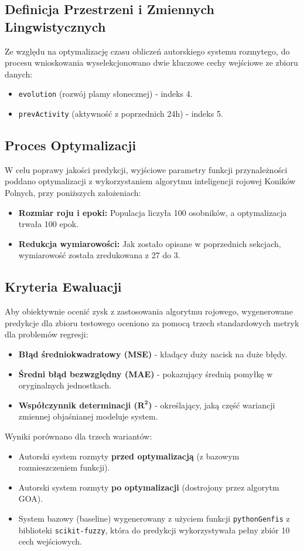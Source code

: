 \documentclass[12pt, a4paper]{article}
\begin{document}
\subsection{Definicja Przestrzeni i Zmiennych Lingwistycznych}
Ze względu na optymalizację czasu obliczeń autorskiego systemu rozmytego, do procesu wnioskowania wyselekcjonowano dwie kluczowe cechy wejściowe ze zbioru danych:
\begin{itemize}
    \item \texttt{evolution} (rozwój plamy słonecznej) - indeks 4.
    \item \texttt{prevActivity} (aktywność z poprzednich 24h) - indeks 5.
\end{itemize}

\subsection{Proces Optymalizacji}
W celu poprawy jakości predykcji, wyjściowe parametry funkcji przynależności poddano optymalizacji z wykorzystaniem algorytmu inteligencji rojowej Koników Polnych, przy poniższych założeniach:
\begin{itemize}
    \item \textbf{Rozmiar roju i epoki:} Populacja liczyła 100 osobników, a optymalizacja trwała 100 epok.
    \item \textbf{Redukcja wymiarowości:} Jak zostało opisane w poprzednich sekcjach, wymiarowość została zredukowana z 27 do 3. 
\end{itemize}

\newpage
\subsection{Kryteria Ewaluacji}
Aby obiektywnie ocenić zysk z zastosowania algorytmu rojowego, wygenerowane predykcje dla zbioru testowego oceniono za pomocą trzech standardowych metryk dla problemów regresji:
\begin{itemize}
    \item \textbf{Błąd średniokwadratowy (MSE)} - kładący duży nacisk na duże błędy.
    \item \textbf{Średni błąd bezwzględny (MAE)} - pokazujący średnią pomyłkę w oryginalnych jednostkach.
    \item \textbf{Współczynnik determinacji ($\mathbf{R^2}$)} - określający, jaką część wariancji zmiennej objaśnianej modeluje system.
\end{itemize}
Wyniki porównano dla trzech wariantów:
\begin{itemize}
    \item Autorski system rozmyty \textbf{przed optymalizacją} (z bazowym rozmieszczeniem funkcji).
    \item Autorski system rozmyty \textbf{po optymalizacji} (dostrojony przez algorytm GOA).
    \item System bazowy (baseline) wygenerowany z użyciem funkcji \texttt{pythonGenfis} z biblioteki \texttt{scikit-fuzzy}, która do predykcji wykorzystywała pełny zbiór 10 cech wejściowych.
\end{itemize}
\end{document}
